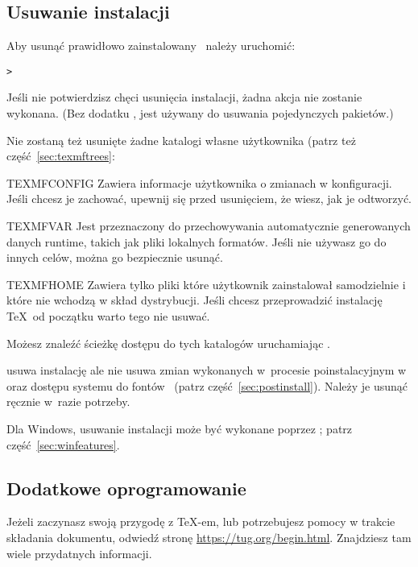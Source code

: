 \documentclass{article}
\begin{document}
\subsection{Usuwanie instalacji \TL}
\label{sec:uninstall}

Aby usunąć prawidłowo zainstalowany \TL\ należy uruchomić:

\begin{alltt}
> 
\end{alltt}
Jeśli nie potwierdzisz chęci usunięcia instalacji, żadna akcja nie zostanie wykonana.
(Bez dodatku ,    jest używany do usuwania pojedynczych pakietów.)

Nie zostaną też usunięte żadne katalogi własne użytkownika (patrz też część~\ref{sec:texmftrees}:
 
\begin{ttdescription}
\item [TEXMFCONFIG]  Zawiera informacje użytkownika o   zmianach w konfiguracji. 
Jeśli chcesz je zachować, upewnij się przed usunięciem, że wiesz, jak je odtworzyć.

\item [TEXMFVAR]  Jest  przeznaczony do przechowywania automatycznie generowanych
danych runtime, takich jak pliki  lokalnych formatów. Jeśli nie używasz go do
innych celów, można go bezpiecznie usunąć.

\item[TEXMFHOME] Zawiera tylko pliki które użytkownik zainstalował  samodzielnie i które nie wchodzą w skład dystrybucji. Jeśli  chcesz przeprowadzić instalację \TeX\ od początku  warto  tego nie usuwać.

\end{ttdescription}

\noindent Możesz znaleźć ścieżkę dostępu do tych katalogów uruchamiając  
 .
 
  usuwa instalację ale nie usuwa zmian wykonanych w~procesie poinstalacyjnym  w~ oraz dostępu systemu do fontów \TL\ (patrz część~\ref{sec:postinstall}). 
 Należy je usunąć ręcznie w~razie potrzeby.

Dla Windows, usuwanie instalacji może być wykonane poprzez \GUI; patrz część~\ref{sec:winfeatures}.


\subsection{Dodatkowe oprogramowanie}
Jeżeli zaczynasz swoją przygodę z \TeX-em, lub potrzebujesz pomocy w trakcie składania dokumentu, odwiedź stronę \url{https://tug.org/begin.html}. Znajdziesz tam wiele przydatnych informacji.
\end{document}
